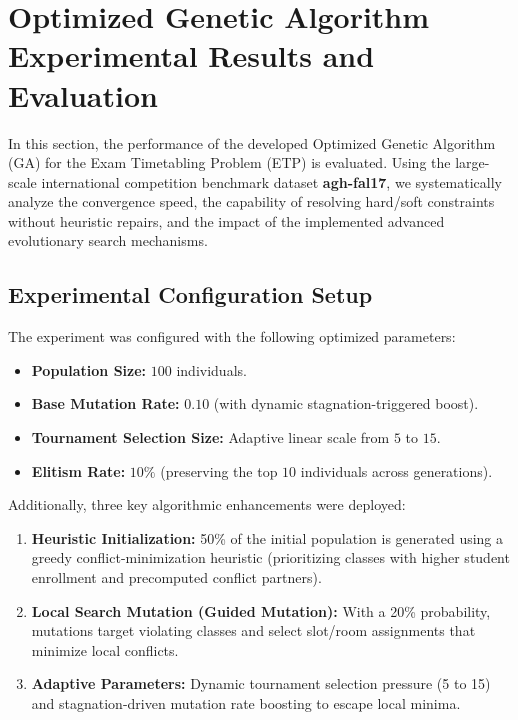 
\section{Optimized Genetic Algorithm Experimental Results and Evaluation}
\label{sec:ga_experimental_results}

In this section, the performance of the developed Optimized Genetic Algorithm (GA) for the Exam Timetabling Problem (ETP) is evaluated. Using the large-scale international competition benchmark dataset \textbf{agh-fal17}, we systematically analyze the convergence speed, the capability of resolving hard/soft constraints without heuristic repairs, and the impact of the implemented advanced evolutionary search mechanisms.

\subsection{Experimental Configuration Setup}
\label{subsec:experimental_configurations}

The experiment was configured with the following optimized parameters:
\begin{itemize}
    \item \textbf{Population Size:} $100$ individuals.
    \item \textbf{Base Mutation Rate:} $0.10$ (with dynamic stagnation-triggered boost).
    \item \textbf{Tournament Selection Size:} Adaptive linear scale from $5$ to $15$.
    \item \textbf{Elitism Rate:} $10\%$ (preserving the top $10$ individuals across generations).
\end{itemize}

Additionally, three key algorithmic enhancements were deployed:
\begin{enumerate}
    \item \textbf{Heuristic Initialization:} 50\% of the initial population is generated using a greedy conflict-minimization heuristic (prioritizing classes with higher student enrollment and precomputed conflict partners).
    \item \textbf{Local Search Mutation (Guided Mutation):} With a 20\% probability, mutations target violating classes and select slot/room assignments that minimize local conflicts.
    \item \textbf{Adaptive Parameters:} Dynamic tournament selection pressure (5 to 15) and stagnation-driven mutation rate boosting to escape local minima.
\end{enumerate}

